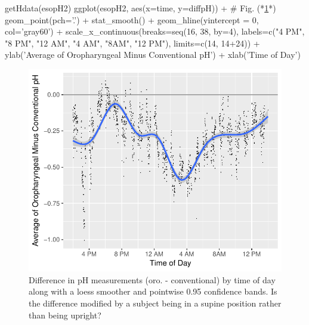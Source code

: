 \begin{Schunk}
\begin{Sinput}
getHdata(esopH2)
ggplot(esopH2, aes(x=time, y=diffpH)) +    # Fig. (*\ref{fig:corr-phtimediff}*)
       geom_point(pch='.') + stat_smooth() +
       geom_hline(yintercept = 0, col='gray60') +
       scale_x_continuous(breaks=seq(16, 38, by=4),
                          labels=c("4 PM", "8 PM", "12 AM",
                            "4 AM", "8AM", "12 PM"),
                          limits=c(14, 14+24)) +
       ylab('Average of Oropharyngeal Minus Conventional pH') +
       xlab('Time of Day')
\end{Sinput}
\begin{figure}[htbp]

\centerline{\includegraphics{corr-phtimediff-1} }

\caption[Difference in pH by time of day]{Difference in pH measurements (oro. - conventional) by time of day along with a loess smoother and pointwise 0.95 confidence bands.  Is the difference modified by a subject being in a supine position rather than being upright?}\label{fig:corr-phtimediff}
\end{figure}
\end{Schunk}
\clearpage
